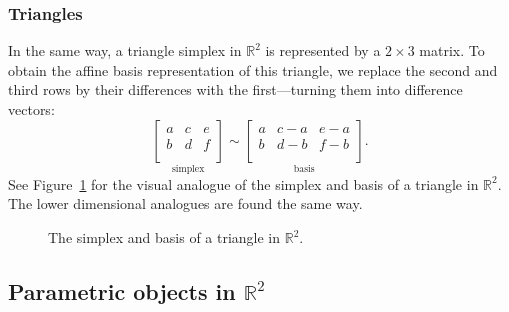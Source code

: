 \subsubsection{Triangles}

In the same way, a triangle simplex in 
\(\mathbb{R}^{2}\) is represented by a \(2\times3\) matrix.
To obtain the affine basis representation of this triangle,
we replace the second and third rows by their differences with 
the first---turning them into difference vectors:
\[
    \underset{\mbox{simplex}}{
        \begin{bmatrix}
            a & c & e \\
            b & d & f \\
        \end{bmatrix}
    }
    \sim
    \underset{\mbox{basis}}{
        \begin{bmatrix}
            a & c - a & e - a \\
            b & d - b & f - b \\
        \end{bmatrix}
    }.
\] 
See Figure~\ref{fig:affine-R2triangle} for the visual analogue of the simplex and basis of a triangle in \(\mathbb{R}^{2}\).
The lower dimensional analogues are found the same way.

\begin{figure}
    \centering
    \caption{The simplex and basis of a triangle in \(\mathbb{R}^{2}\).}
    \label{fig:affine-R2triangle}
\end{figure}

\subsection{Parametric objects in \texorpdfstring{\(\mathbb{R}^{2}\)}{R2}}

